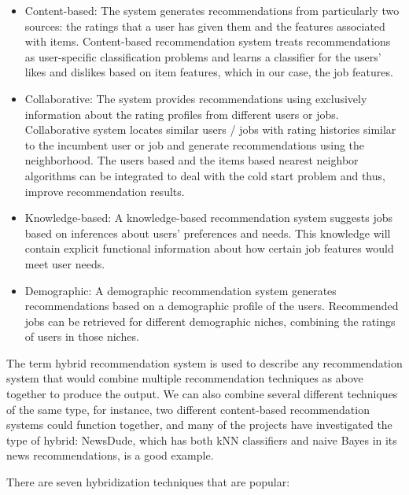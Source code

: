 \documentclass[sigconf]{acmart}
\begin{document}
\begin{itemize}
  \item Content-based: The system generates recommendations from particularly two sources: the ratings that a user has given them and the features associated with items. Content-based recommendation system treats recommendations as user-specific classification problems and learns a classifier for the users' likes and dislikes based on item features, which in our case, the job features.\cite{CBF2017}
  \item Collaborative: The system provides recommendations using exclusively information about the rating profiles from different users or jobs. Collaborative system locates similar users / jobs with rating histories similar to the incumbent user or job and generate recommendations using the neighborhood.\cite{Standford} The users based and the items based nearest neighbor algorithms can be integrated to deal with the cold start problem and thus, improve recommendation results.
  \item Knowledge-based: A knowledge-based recommendation system suggests jobs based on inferences about users' preferences and needs.\cite{Standford} This knowledge will contain explicit functional information about how certain job features would meet user needs.
  \item Demographic: A demographic recommendation system generates recommendations based on a demographic profile of the users. Recommended jobs can be retrieved for different demographic niches, combining the ratings of users in those niches.
\end{itemize}

\par The term hybrid recommendation system is used to describe any recommendation system that would combine multiple recommendation techniques as above together to produce the output.\cite{Standford} We can also combine several different techniques of the same type, for instance, two different content-based recommendation systems could function together, and many of the projects have investigated the type of hybrid: NewsDude, which has both kNN classifiers and naive Bayes in its news recommendations, is a good example.

\par There are seven hybridization techniques that are popular:
\end{document}
